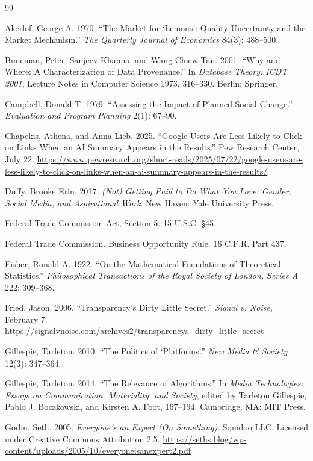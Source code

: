 \documentclass[11pt]{article}
\theoremstyle{remark}
\begin{document}
\begin{thebibliography}{99}

Akerlof, George A. 1970. ``The Market for `Lemons': Quality Uncertainty and the Market Mechanism.'' \emph{The Quarterly Journal of Economics} 84(3): 488--500.

Buneman, Peter, Sanjeev Khanna, and Wang-Chiew Tan. 2001. ``Why and Where: A Characterization of Data Provenance.'' In \emph{Database Theory: ICDT 2001}, Lecture Notes in Computer Science 1973, 316--330. Berlin: Springer.

Campbell, Donald T. 1979. ``Assessing the Impact of Planned Social Change.'' \emph{Evaluation and Program Planning} 2(1): 67--90.

Chapekis, Athena, and Anna Lieb. 2025. ``Google Users Are Less Likely to Click on Links When an AI Summary Appears in the Results.'' Pew Research Center, July 22. \url{https://www.pewresearch.org/short-reads/2025/07/22/google-users-are-less-likely-to-click-on-links-when-an-ai-summary-appears-in-the-results/}

Duffy, Brooke Erin. 2017. \emph{(Not) Getting Paid to Do What You Love: Gender, Social Media, and Aspirational Work}. New Haven: Yale University Press.

Federal Trade Commission Act, Section 5. 15 U.S.C. \S 45.

Federal Trade Commission. Business Opportunity Rule. 16 C.F.R. Part 437.

Fisher, Ronald A. 1922. ``On the Mathematical Foundations of Theoretical Statistics.'' \emph{Philosophical Transactions of the Royal Society of London, Series A} 222: 309--368.

Fried, Jason. 2006. ``Transparency's Dirty Little Secret.'' \emph{Signal v. Noise}, February 7. \url{https://signalvnoise.com/archives2/transparencys_dirty_little_secret}

Gillespie, Tarleton. 2010. ``The Politics of `Platforms'.'' \emph{New Media \& Society} 12(3): 347--364.

Gillespie, Tarleton. 2014. ``The Relevance of Algorithms.'' In \emph{Media Technologies: Essays on Communication, Materiality, and Society}, edited by Tarleton Gillespie, Pablo J. Boczkowski, and Kirsten A. Foot, 167--194. Cambridge, MA: MIT Press.

Godin, Seth. 2005. \emph{Everyone's an Expert (On Something)}. Squidoo LLC. Licensed under Creative Commons Attribution 2.5. \url{https://seths.blog/wp-content/uploads/2005/10/everyoneisanexpert2.pdf}


\end{thebibliography}
\end{document}
